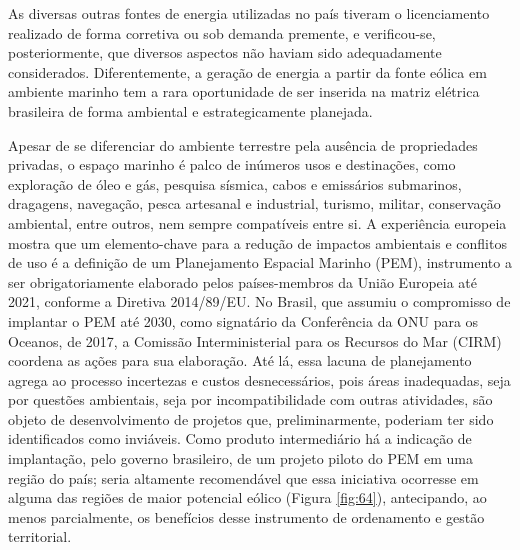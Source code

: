 \documentclass[
  oneside]{scrbook}
\begin{document}
As diversas outras fontes de energia utilizadas no país tiveram o licenciamento realizado de forma corretiva ou sob demanda premente, e verificou-se, posteriormente, que diversos aspectos não haviam sido adequadamente considerados. Diferentemente, a geração de energia a partir da fonte eólica em ambiente marinho tem a rara oportunidade de ser inserida na matriz elétrica brasileira de forma ambiental e estrategicamente planejada.

Apesar de se diferenciar do ambiente terrestre pela ausência de propriedades privadas, o espaço marinho é palco de inúmeros usos e destinações, como exploração de óleo e gás, pesquisa sísmica, cabos e emissários submarinos, dragagens, navegação, pesca artesanal e industrial, turismo, militar, conservação ambiental, entre outros, nem sempre compatíveis entre si. A experiência europeia mostra que um elemento-chave para a redução de impactos ambientais e conflitos de uso é a definição de um Planejamento Espacial Marinho (PEM), instrumento a ser obrigatoriamente elaborado pelos países-membros da União Europeia até 2021, conforme a Diretiva 2014/89/EU. No Brasil, que assumiu o compromisso de implantar o PEM até 2030, como signatário da Conferência da ONU para os Oceanos, de 2017, a Comissão Interministerial para os Recursos do Mar (CIRM) coordena as ações para sua elaboração. Até lá, essa lacuna de planejamento agrega ao processo incertezas e custos desnecessários, pois áreas inadequadas, seja por questões ambientais, seja por incompatibilidade com outras atividades, são objeto de desenvolvimento de projetos que, preliminarmente, poderiam ter sido identificados como inviáveis. Como produto intermediário há a indicação de implantação, pelo governo brasileiro, de um projeto piloto do PEM em uma região do país; seria altamente recomendável que essa iniciativa ocorresse em alguma das regiões de maior potencial eólico (Figura \ref{fig:64}), antecipando, ao menos parcialmente, os benefícios desse instrumento de ordenamento e gestão territorial.
\end{document}
